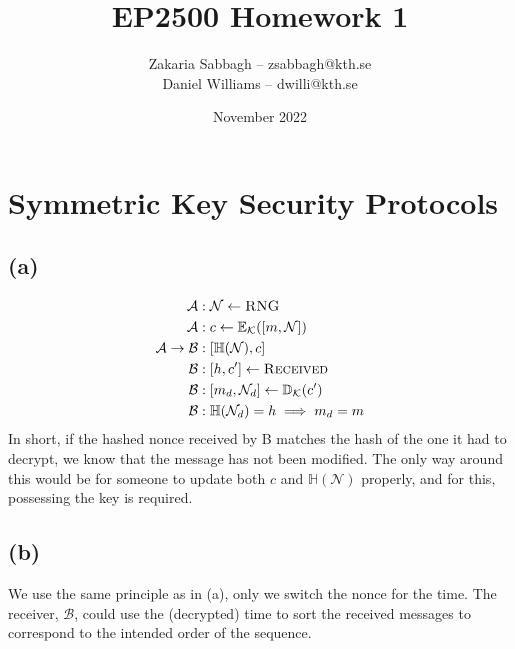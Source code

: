 \documentclass{article}
\title{EP2500 Homework 1}
\author{Zakaria Sabbagh -- zsabbagh@kth.se \\ Daniel Williams -- dwilli@kth.se}
\date{November 2022}
\begin{document}
\maketitle

\newpage

\tableofcontents

\newpage
\section{Symmetric Key Security Protocols}

\subsection*{(a)}

\begin{align*}
    \mathcal A &: \mathcal N \leftarrow \textsc{RNG} 
    \\
    \mathcal A &: c \leftarrow \mathbb E_\mathcal{K} ([m, \mathcal N]) 
    \\
    \mathcal A \rightarrow \mathcal B &: [\mathbb H(\mathcal N), c] 
    \\
   \mathcal B &: [h, c'] \leftarrow \textsc{Received} 
   \\
   \mathcal B &: [m_d, \mathcal N_d] \leftarrow \mathbb D_{\mathcal K} (c') 
   \\
   \mathcal B &: \mathbb H (\mathcal N_d) = h \implies m_d = m
\end{align*}
In short, if the hashed nonce received by B matches the hash of the one it had to decrypt, we know that the message has not been modified. The only way around this would be for someone to update both $c$ and $\mathbb{H}(\mathcal{N})$ properly, and for this, possessing the key is required.
\subsection*{(b)}

We use the same principle as in (a), only we switch the nonce for the time.
The receiver, $\mathcal B$, could use the (decrypted) time to sort the received messages to correspond to the intended order of the sequence.
\end{document}
